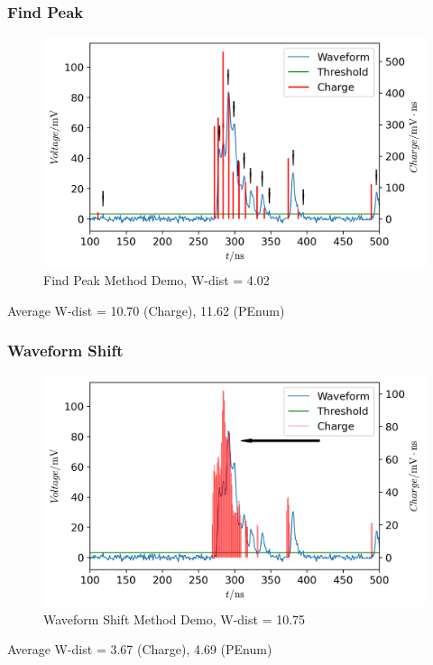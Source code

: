 \documentclass{beamer}
\begin{document}
\begin{frame}
\frametitle{Find Peak}
\begin{figure}
    \centering
    \caption{Find Peak Method Demo, W-dist = 4.02}
    \includegraphics[width=0.9\linewidth]{img/findpeak.png}
\end{figure}
\vspace{-4mm}
\begin{center}
    Average W-dist = 10.70 (Charge), 11.62 (PEnum)
\end{center}
\end{frame}

\begin{frame}
\frametitle{Waveform Shift}
\begin{figure}
    \centering
    \caption{Waveform Shift Method Demo, W-dist = 10.75}
    \includegraphics[width=0.9\linewidth]{img/threshold.png}
\end{figure}
\vspace{-4mm}
\begin{center}
    Average W-dist = 3.67 (Charge), 4.69 (PEnum)
\end{center}
\end{frame}
\end{document}

